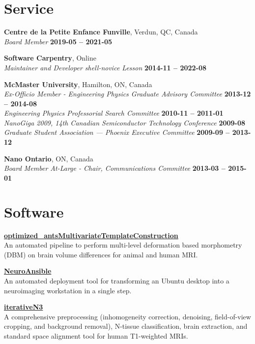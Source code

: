 \documentclass[margin1,line,canadian]{resume}
\begin{document}
\begin{resume}
\section{\mysidestyle{}Service}
\textbf{Centre de la Petite Enfance Funville}, Verdun, QC, Canada\\%
\textsl{Board Member} \hfill \textbf{2019-05 -- 2021-05}

\textbf{Software Carpentry}, Online\\%
\textsl{Maintainer and Developer shell-novice Lesson} \hfill \textbf{2014-11 -- 2022-08}

\textbf{McMaster University}, Hamilton, ON, Canada\\%
\textsl{Ex-Officio Member - Engineering Physics Graduate Advisory Committee} \hfill \textbf{2013-12 -- 2014-08}\\
\textsl{Engineering Physics Professorial Search Committee} \hfill \textbf{2010-11 -- 2011-01}\\
\textsl{NanoGiga 2009, 14th Canadian Semiconductor Technology Conference} \hfill \textbf{2009-08}\\
\textsl{Graduate Student Association --- Phoenix Executive Committee} \hfill \textbf{2009-09 -- 2013-12}

\textbf{Nano Ontario}, ON, Canada\\%
\textsl{Board Member At-Large - Chair, Communications Committee} \hfill \textbf{2013-03 -- 2015-01}

\section{\mysidestyle{}Software}
\textbf{\href{https://github.com/CoBrALab/optimized_antsMultivariateTemplateConstruction}{\color{black}optimized\_antsMultivariateTemplateConstruction}}\\%
An automated pipeline to perform multi-level deformation based morphometry (DBM) on brain volume differences for animal and human MRI.

\textbf{\href{https://github.com/gdevenyi/NeuroAnsible}{\color{black}NeuroAnsible}}\\%
An automated deployment tool for transforming an Ubuntu desktop into a neuroimaging workstation in a single step.

\textbf{\href{https://github.com/CoBrALab/iterativeN3}{\color{black}iterativeN3}}\\%
A comprehensive preprocessing (inhomogeneity correction, denoising, field-of-view cropping, and background removal), N-tissue
classification, brain extraction, and standard space alignment tool for human T1-weighted MRIs.


\end{resume}
\end{document}
